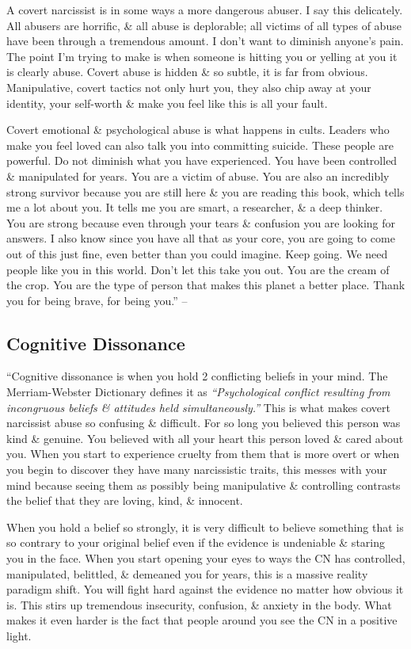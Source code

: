 \documentclass{article}
\numberwithin{equation}{section}
\begin{document}
A covert narcissist is in some ways a more dangerous abuser. I say this delicately. All abusers are horrific, \& all abuse is deplorable; all victims of all types of abuse have been through a tremendous amount. I don't want to diminish anyone's pain. The point I'm trying to make is when someone is hitting you or yelling at you it is clearly abuse. Covert abuse is hidden \& so subtle, it is far from obvious. Manipulative, covert tactics not only hurt you, they also chip away at your identity, your self-worth \& make you feel like this is all your fault.

Covert emotional \& psychological abuse is what happens in cults. Leaders who make you feel loved can also talk you into committing suicide. These people are powerful. Do not diminish what you have experienced. You have been controlled \& manipulated for years. You are a victim of abuse. You are also an incredibly strong survivor because you are still here \& you are reading this book, which tells me a lot about you. It tells me you are smart, a researcher, \& a deep thinker. You are strong because even through your tears \& confusion you are looking for answers. I also know since you have all that as your core, you are going to come out of this just fine, even better than you could imagine. Keep going. We need people like you in this world. Don't let this take you out. You are the cream of the crop. You are the type of person that makes this planet a better place. Thank you for being brave, for being you.'' -- \cite[pp. 151--152]{Mirza2017}

\subsection{Cognitive Dissonance}
``Cognitive dissonance is when you hold 2 conflicting beliefs in your mind. The Merriam-Webster Dictionary defines it as \textit{``Psychological conflict resulting from incongruous beliefs \& attitudes held simultaneously.''} This is what makes covert narcissist abuse so confusing \& difficult. For so long you believed this person was kind \& genuine. You believed with all your heart this person loved \& cared about you. When you start to experience cruelty from them that is more overt or when you begin to discover they have many narcissistic traits, this messes with your mind because seeing them as possibly being manipulative \& controlling contrasts the belief that they are loving, kind, \& innocent.

When you hold a belief so strongly, it is very difficult to believe something that is so contrary to your original belief even if the evidence is undeniable \& staring you in the face. When you start opening your eyes to ways the CN has controlled, manipulated, belittled, \& demeaned you for years, this is a massive reality paradigm shift. You will fight hard against the evidence no matter how obvious it is. This stirs up tremendous insecurity, confusion, \& anxiety in the body. What makes it even harder is the fact that people around you see the CN in a positive light.
\end{document}
